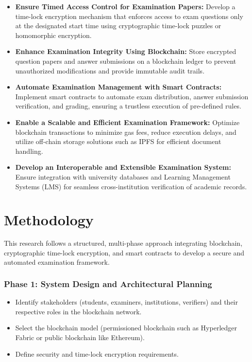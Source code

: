\documentclass[12pt,a4paper]{article}
\begin{document}
\begin{itemize}
    \item \textbf{Ensure Timed Access Control for Examination Papers:}  
    Develop a time-lock encryption mechanism that enforces access to exam questions only at the designated start time using cryptographic time-lock puzzles or homomorphic encryption.
    
    \item \textbf{Enhance Examination Integrity Using Blockchain:}  
    Store encrypted question papers and answer submissions on a blockchain ledger to prevent unauthorized modifications and provide immutable audit trails.

    \item \textbf{Automate Examination Management with Smart Contracts:}  
    Implement smart contracts to automate exam distribution, answer submission verification, and grading, ensuring a trustless execution of pre-defined rules.

    \item \textbf{Enable a Scalable and Efficient Examination Framework:}  
    Optimize blockchain transactions to minimize gas fees, reduce execution delays, and utilize off-chain storage solutions such as IPFS for efficient document handling.

    \item \textbf{Develop an Interoperable and Extensible Examination System:}  
    Ensure integration with university databases and Learning Management Systems (LMS) for seamless cross-institution verification of academic records.
\end{itemize}
\newpage
\section{Methodology}
This research follows a structured, multi-phase approach integrating blockchain, cryptographic time-lock encryption, and smart contracts to develop a secure and automated examination framework.

\subsubsection{Phase 1: System Design and Architectural Planning}
\begin{itemize}
    \item Identify stakeholders (students, examiners, institutions, verifiers) and their respective roles in the blockchain network.
    \item Select the blockchain model (permissioned blockchain such as Hyperledger Fabric or public blockchain like Ethereum).
    \item Define security and time-lock encryption requirements.
\end{itemize}
\end{document}
